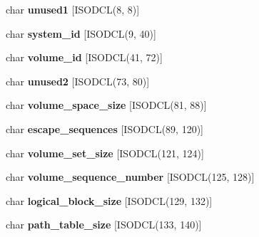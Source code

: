 \begin{DoxyCompactItemize}
char {\bfseries unused1} \mbox{[}I\+S\+O\+D\+CL(8, 8)\mbox{]}
\item 
\mbox{\label{structiso__primary__descriptor_a1ba9066125172b07698afac7d7a4aebc}} 
char {\bfseries system\+\_\+id} \mbox{[}I\+S\+O\+D\+CL(9, 40)\mbox{]}
\item 
\mbox{\label{structiso__primary__descriptor_a57ef5dfa087e2a657fc6307b07e332ea}} 
char {\bfseries volume\+\_\+id} \mbox{[}I\+S\+O\+D\+CL(41, 72)\mbox{]}
\item 
\mbox{\label{structiso__primary__descriptor_a7857d2cfc5692ee65e3b938a0b83fdaa}} 
char {\bfseries unused2} \mbox{[}I\+S\+O\+D\+CL(73, 80)\mbox{]}
\item 
\mbox{\label{structiso__primary__descriptor_aab1de8be18a3a583b0b9c3a2b7ee578a}} 
char {\bfseries volume\+\_\+space\+\_\+size} \mbox{[}I\+S\+O\+D\+CL(81, 88)\mbox{]}
\item 
\mbox{\label{structiso__primary__descriptor_a3a4ba44e7cf41abde0bb44ed3988fa5c}} 
char {\bfseries escape\+\_\+sequences} \mbox{[}I\+S\+O\+D\+CL(89, 120)\mbox{]}
\item 
\mbox{\label{structiso__primary__descriptor_a3489a2b54325e93b108d3ad5b9e5a0e9}} 
char {\bfseries volume\+\_\+set\+\_\+size} \mbox{[}I\+S\+O\+D\+CL(121, 124)\mbox{]}
\item 
\mbox{\label{structiso__primary__descriptor_a03832896c06e6ac00c8ff56a3aef617c}} 
char {\bfseries volume\+\_\+sequence\+\_\+number} \mbox{[}I\+S\+O\+D\+CL(125, 128)\mbox{]}
\item 
\mbox{\label{structiso__primary__descriptor_ad573a5d47527701ce770fedc5a707df8}} 
char {\bfseries logical\+\_\+block\+\_\+size} \mbox{[}I\+S\+O\+D\+CL(129, 132)\mbox{]}
\item 
\mbox{\label{structiso__primary__descriptor_a1c8a779f43a1ffa5fe86f805fc474db8}} 
char {\bfseries path\+\_\+table\+\_\+size} \mbox{[}I\+S\+O\+D\+CL(133, 140)\mbox{]}

\end{DoxyCompactItemize}
